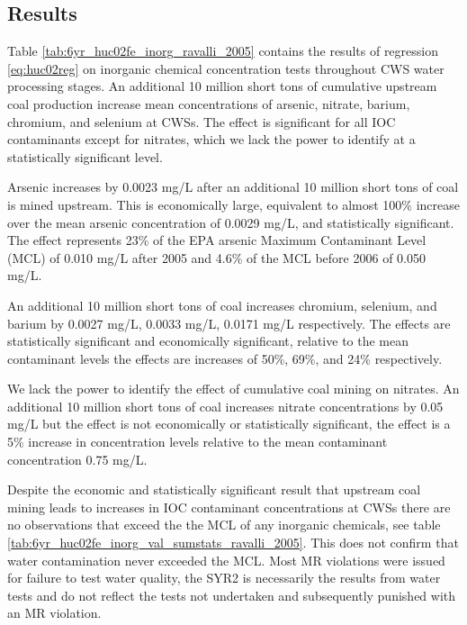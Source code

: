 \documentclass{article}
\begin{document}
\subsection{Results}



Table \ref{tab:6yr_huc02fe_inorg_ravalli_2005} contains the results of regression \ref{eq:huc02reg} on inorganic chemical concentration tests throughout CWS water processing stages. An additional 10 million short tons of cumulative upstream coal production increase mean concentrations of arsenic, nitrate, barium, chromium, and selenium at CWSs. The effect is significant for all IOC contaminants except for nitrates, which we lack the power to identify at a statistically significant level.

Arsenic increases by 0.0023 mg/L after an additional 10 million short tons of coal is mined upstream. This is economically large, equivalent to almost 100\% increase over the mean arsenic concentration of 0.0029 mg/L, and statistically significant. The effect represents 23\% of the EPA arsenic Maximum Contaminant Level (MCL) of 0.010 mg/L after 2005 and 4.6\% of the MCL before 2006 of 0.050 mg/L.

An additional 10 million short tons of coal increases chromium, selenium, and barium by 0.0027 mg/L, 0.0033 mg/L, 0.0171 mg/L respectively. The effects are statistically significant and economically significant, relative to the mean contaminant levels the effects are increases of 50\%, 69\%, and 24\% respectively.

We lack the power to identify the effect of cumulative coal mining on nitrates. An additional 10 million short tons of coal increases nitrate concentrations by 0.05 mg/L but the effect is not economically or statistically significant, the effect is a 5\% increase in concentration levels relative to the mean contaminant concentration 0.75 mg/L.

Despite the economic and statistically significant result that upstream coal mining leads to increases in IOC contaminant concentrations at CWSs there are no observations that exceed the the MCL of any inorganic chemicals, see table \ref{tab:6yr_huc02fe_inorg_val_sumstats_ravalli_2005}. This does not confirm that water contamination never exceeded the MCL. Most MR violations were issued for failure to test water quality, the SYR2 is necessarily the results from water tests and do not reflect the tests not undertaken and subsequently punished with an MR violation.
\end{document}
